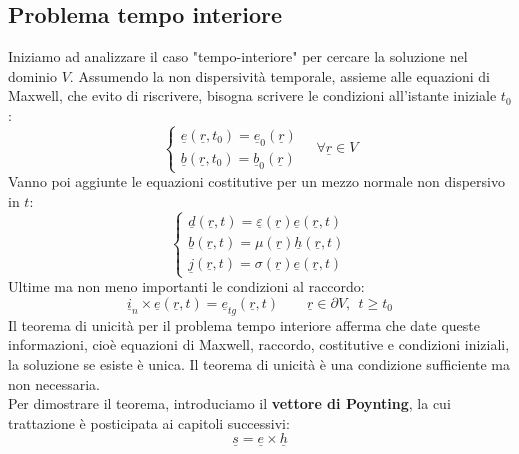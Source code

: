 \documentclass{book}
\begin{document}
        \subsection{Problema tempo interiore}
        Iniziamo ad analizzare il caso "tempo-interiore" per cercare la soluzione nel dominio $V$. Assumendo la non dispersività temporale, assieme alle equazioni di Maxwell, che evito di riscrivere, bisogna scrivere le condizioni all'istante iniziale $t_{0}$:
        \begin{equation}
            \begin{cases}
                \underline{e}(\underline{r},t_{0}) = \underline{e}_{0}(\underline{r}) \\
                \underline{b}(\underline{r},t_{0}) = \underline{b}_{0}(\underline{r})
            \end{cases} \quad \forall \underline{r} \in V
        \end{equation}
        Vanno poi aggiunte le equazioni costitutive per un mezzo normale non dispersivo in $t$:
        \begin{equation}
        \begin{cases}
            \underline{d}(\underline{r},t) = \underline{\varepsilon}(\underline{r}) \underline{e}(\underline{r},t) \\
            \underline{b}(\underline{r},t) = \mu (\underline{r}) \underline{h}(\underline{r},t) \\
            \underline{j}(\underline{r},t) = \sigma ( \underline{r}) \underline{e}(\underline{r},t)
        \end{cases}
        \end{equation}
        Ultime ma non meno importanti le condizioni al raccordo:
        \begin{equation}
            \underline{i}_{n} \times \underline{e}(\underline{r}, t) = \underline{e}_{tg}(\underline{r},t) \qquad \underline{r} \in \partial V, \ \ t \geq t_{0}
        \end{equation}
        Il teorema di unicità per il problema tempo interiore afferma che date queste informazioni, cioè equazioni di Maxwell, raccordo, costitutive e condizioni iniziali, la soluzione se esiste è unica. Il teorema di unicità è una condizione sufficiente ma non necessaria. \\
        Per dimostrare il teorema, introduciamo il \textbf{vettore di Poynting}, la cui trattazione è posticipata ai capitoli successivi:
        \begin{equation}
            \underline{s} = \underline{e} \times \underline{h}
        \end{equation}
\end{document}
